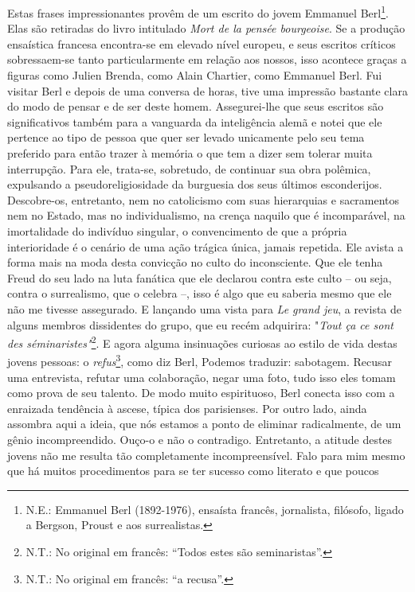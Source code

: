 Estas frases impressionantes provêm de um escrito do jovem Emmanuel
Berl\footnote{N.E.: Emmanuel Berl (1892-1976), ensaísta francês,
  jornalista, filósofo, ligado a Bergson, Proust e aos surrealistas.}.
Elas são retiradas do livro intitulado \emph{Mort de la pensée
bourgeoise}. Se a produção ensaística francesa encontra-se em elevado
nível europeu, e seus escritos críticos sobressaem-se tanto
particularmente em relação aos nossos, isso acontece graças a figuras
como Julien Brenda, como Alain Chartier, como Emmanuel Berl. Fui visitar
Berl e depois de uma conversa de horas, tive uma impressão bastante
clara do modo de pensar e de ser deste homem. Assegurei-lhe que seus
escritos são significativos também para a vanguarda da inteligência
alemã e notei que ele pertence ao tipo de pessoa que quer ser levado
unicamente pelo seu tema preferido para então trazer à memória o que tem
a dizer sem tolerar muita interrupção. Para ele, trata-se, sobretudo, de
continuar sua obra polêmica, expulsando a pseudoreligiosidade da
burguesia dos seus últimos esconderijos. Descobre-os, entretanto, nem no
catolicismo com suas hierarquias e sacramentos nem no Estado, mas no
individualismo, na crença naquilo que é incomparável, na imortalidade do
indivíduo singular, o convencimento de que a própria interioridade é o
cenário de uma ação trágica única, jamais repetida. Ele avista a forma
mais na moda desta convicção no culto do inconsciente. Que ele tenha
Freud do seu lado na luta fanática que ele declarou contra este culto --
ou seja, contra o surrealismo, que o celebra --, isso é algo que eu
saberia mesmo que ele não me tivesse assegurado. E lançando uma vista
para \emph{Le grand jeu}, a revista de alguns membros dissidentes do
grupo, que eu recém adquirira: "\emph{Tout ça ce sont des
séminaristes"}\footnote{N.T.: No original em francês: ``Todos estes são
  seminaristas''.}. E agora alguma insinuações curiosas ao estilo de
vida destas jovens pessoas: o \emph{refus}\footnote{N.T.: No original em
  francês: ``a recusa''.}, como diz Berl, Podemos traduzir: sabotagem.
Recusar uma entrevista, refutar uma colaboração, negar uma foto, tudo
isso eles tomam como prova de seu talento. De modo muito espirituoso,
Berl conecta isso com a enraizada tendência à ascese, típica dos
parisienses. Por outro lado, ainda assombra aqui a ideia, que nós
estamos a ponto de eliminar radicalmente, de um gênio incompreendido.
Ouço-o e não o contradigo. Entretanto, a atitude destes jovens não me
resulta tão completamente incompreensível. Falo para mim mesmo que há
muitos procedimentos para se ter sucesso como literato e que poucos
